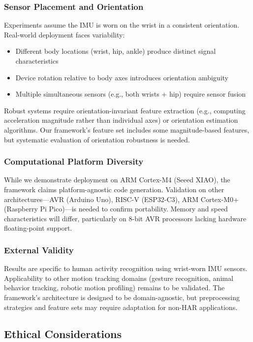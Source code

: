 \subsubsection{Sensor Placement and Orientation}
Experiments assume the IMU is worn on the wrist in a consistent orientation. Real-world deployment faces variability:
\begin{itemize}
    \item Different body locations (wrist, hip, ankle) produce distinct signal characteristics
    \item Device rotation relative to body axes introduces orientation ambiguity
    \item Multiple simultaneous sensors (e.g., both wrists + hip) require sensor fusion
\end{itemize}

Robust systems require orientation-invariant feature extraction (e.g., computing acceleration magnitude rather than individual axes) or orientation estimation algorithms. Our framework's feature set includes some magnitude-based features, but systematic evaluation of orientation robustness is needed.

\subsubsection{Computational Platform Diversity}
While we demonstrate deployment on ARM Cortex-M4 (Seeed XIAO), the framework claims platform-agnostic code generation. Validation on other architectures—AVR (Arduino Uno), RISC-V (ESP32-C3), ARM Cortex-M0+ (Raspberry Pi Pico)—is needed to confirm portability. Memory and speed characteristics will differ, particularly on 8-bit AVR processors lacking hardware floating-point support.

\subsubsection{External Validity}
Results are specific to human activity recognition using wrist-worn IMU sensors. Applicability to other motion tracking domains (gesture recognition, animal behavior tracking, robotic motion profiling) remains to be validated. The framework's architecture is designed to be domain-agnostic, but preprocessing strategies and feature sets may require adaptation for non-HAR applications.

\subsection{Ethical Considerations}

